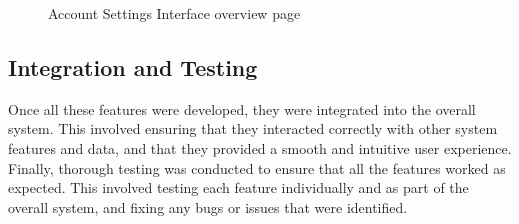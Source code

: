 \begin{figure}[H]
    \centering
    \caption{ Account Settings Interface overview page}
    \label{fig:Account-Settings-Interface-overview-page}
\end{figure}


\subsection{Integration and Testing}

Once all these features were developed, they were integrated into the overall system. This involved ensuring that they interacted correctly with other system features and data, and that they provided a smooth and intuitive user experience.
Finally, thorough testing was conducted to ensure that all the features worked as expected. This involved testing each feature individually and as part of the overall system, and fixing any bugs or issues that were identified.



